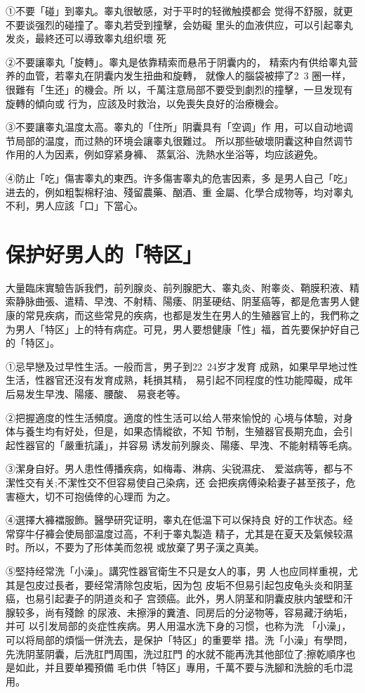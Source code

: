 \documentclass[12pt,UTF8]{ctexbook}
\begin{document}
①不要「碰」到睾丸。睾丸很敏感，对于平时的轻微触摸都会
觉得不舒服，就更不要谈强烈的碰撞了。睾丸若受到撞擊，会妨礙
里头的血液供应，可以引起睾丸发炎，最終还可以導致睾丸组织壞
死

②不要讓睾丸「旋轉」。睾丸是依靠精索而悬吊于阴囊内的，
精索内有供给睾丸营养的血管，若睾丸在阴囊内发生扭曲和旋轉，
就像人的腦袋被擰了2~3 圈一样，很難有「生还」的機会。所
以，千萬注意局部不要受到劇烈的撞擊，一旦发现有旋轉的傾向或
行为，应該及时救治，以免喪失良好的治療機会。

③不要讓睾丸温度太高。睾丸的「住所」阴囊具有「空调」作
用，可以自动地调节局部的温度，而过熱的环境会讓睾丸很難过。
所以那些破壞阴囊这种自然调节作用的人为因素，例如穿紧身褲、
蒸氣浴、洗熱水坐浴等，均应該避免。

④防止「吃」傷害睾丸的東西。许多傷害睾丸的危害因素，多
是男人自己「吃」进去的，例如粗製棉籽油、殘留農藥、酗酒、重
金屬、化學合成物等，均对睾丸不利，男人应該「口」下當心。

\section{保护好男人的「特区」}

大量臨床實驗告訴我們，前列腺炎、前列腺肥大、睾丸炎、附睾炎、鞘膜积液、精索静脉曲張、遣精、早洩、不射精、陽痿、阴茎硬结、阴茎癌等，都是危害男人健康的常見疾病，而这些常見的疾病，也都是发生在男人的生殖器官上的，我們称之为男人「特区」上的特有病症。可見，男人要想健康「性」福，首先要保护好自己的「特区」。

①忌早戀及过早性生活。一般而言，男子到22~24岁才发育
成熟，如果早早地过性生活，性器官还沒有发育成熟，耗損其精，
易引起不同程度的性功能障礙，成年后易发生早洩、陽痿、腰酸、
易衰老等。

②把握適度的性生活頻度。適度的性生活可以给人带來愉悅的
心境与体驗，对身体与養生均有好处，但是，如果态情縱欲，不知
节制，生殖器官長期充血，会引起性器官的「嚴重抗議」，并容易
诱发前列腺炎、陽痿、早洩、不能射精等毛病。

③潔身自好。男人患性傅播疾病，如梅毒、淋病、尖锐濕疣、
爱滋病等，都与不潔性交有关;不潔性交不但容易使自己染病，还
会把疾病傅染耠妻子甚至孩子，危害極大，切不可抱僥倖的心理而
为之。

④選擇大褲襠服飾。醫學研究证明，睾丸在低温下可以保持良
好的工作状态。经常穿牛仔褲会使局部温度过高，不利于睾丸製造
精子，尤其是在夏天及氣候较濕时。所以，不要为了形体美而忽視
或放棄了男子漢之真美。

⑤堅持经常洗「小澡」。講究性器官衛生不只是女人的事，男
人也应同样重視，尤其是包皮过長者，要经常清除包皮垢，因为包
皮垢不但易引起包皮龟头炎和阴茎癌，也易引起妻子的阴道炎和子
宫颈癌。此外，男人阴茎和阴囊皮肤内皱壁和汗腺较多，尚有殘餘
的尿液、未擦淨的糞渣、同房后的分泌物等，容易藏汙纳垢，并可
以引发局部的炎症性疾病。男人用温水洗下身的习惯，也称为洗
「小澡」，可以将局部的煩惱一併洗去，是保护「特区」的重要举
措。洗「小澡」有學問，先洗阴茎阴囊，后洗肛門周围，洗过肛門
的水就不能再洗其他部位了;擦乾順序也是如此，并且要单獨預備
毛巾供「特区」專用，千萬不要与洗腳和洗臉的毛巾混用。
\end{document}
